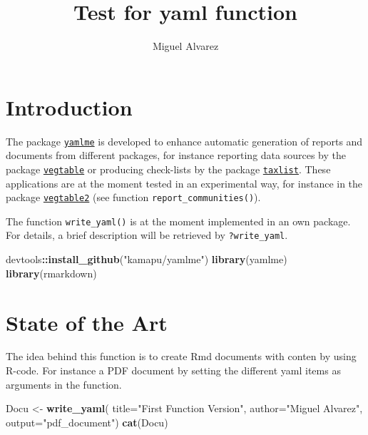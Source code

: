 \documentclass[
]{article}
\title{Test for yaml function}
\author{Miguel Alvarez}
\date{}
\newenvironment{Shaded}{\begin{snugshade}}{\end{snugshade}}
\newcommand{\DataTypeTok}[1]{\textcolor[rgb]{0.13,0.29,0.53}{#1}}
\newcommand{\KeywordTok}[1]{\textcolor[rgb]{0.13,0.29,0.53}{\textbf{#1}}}
\newcommand{\NormalTok}[1]{#1}
\newcommand{\OperatorTok}[1]{\textcolor[rgb]{0.81,0.36,0.00}{\textbf{#1}}}
\newcommand{\StringTok}[1]{\textcolor[rgb]{0.31,0.60,0.02}{#1}}
\begin{document}
\maketitle

\hypertarget{introduction}{%
\section{Introduction}\label{introduction}}

The package \href{https://github.com/kamapu/yamlme}{\texttt{yamlme}} is
developed to enhance automatic generation of reports and documents from
different packages, for instance reporting data sources by the package
\href{https://github.com/kamapu/vegtable}{\texttt{vegtable}} or
producing check-lists by the package
\href{https://github.com/kamapu/taxlist}{\texttt{taxlist}}. These
applications are at the moment tested in an experimental way, for
instance in the package
\href{https://github.com/kamapu/vegtable2}{\texttt{vegtable2}} (see
function \texttt{report\_communities()}).

The function \texttt{write\_yaml()} is at the moment implemented in an
own package. For details, a brief description will be retrieved by
\texttt{?write\_yaml}.

\begin{Shaded}
\begin{Highlighting}[]
\NormalTok{devtools}\OperatorTok{::}\KeywordTok{install\_github}\NormalTok{(}\StringTok{"kamapu/yamlme"}\NormalTok{)}
\KeywordTok{library}\NormalTok{(yamlme)}
\KeywordTok{library}\NormalTok{(rmarkdown)}
\end{Highlighting}
\end{Shaded}

\hypertarget{state-of-the-art}{%
\section{State of the Art}\label{state-of-the-art}}

The idea behind this function is to create Rmd documents with conten by
using R-code. For instance a PDF document by setting the different yaml
items as arguments in the function.

\begin{Shaded}
\begin{Highlighting}[]
\NormalTok{Docu \textless{}{-}}\StringTok{ }\KeywordTok{write\_yaml}\NormalTok{(}
        \DataTypeTok{title=}\StringTok{"First Function Version"}\NormalTok{,}
        \DataTypeTok{author=}\StringTok{"Miguel Alvarez"}\NormalTok{,}
        \DataTypeTok{output=}\StringTok{"pdf\_document"}\NormalTok{)}
\KeywordTok{cat}\NormalTok{(Docu)}
\end{Highlighting}
\end{Shaded}
\end{document}
